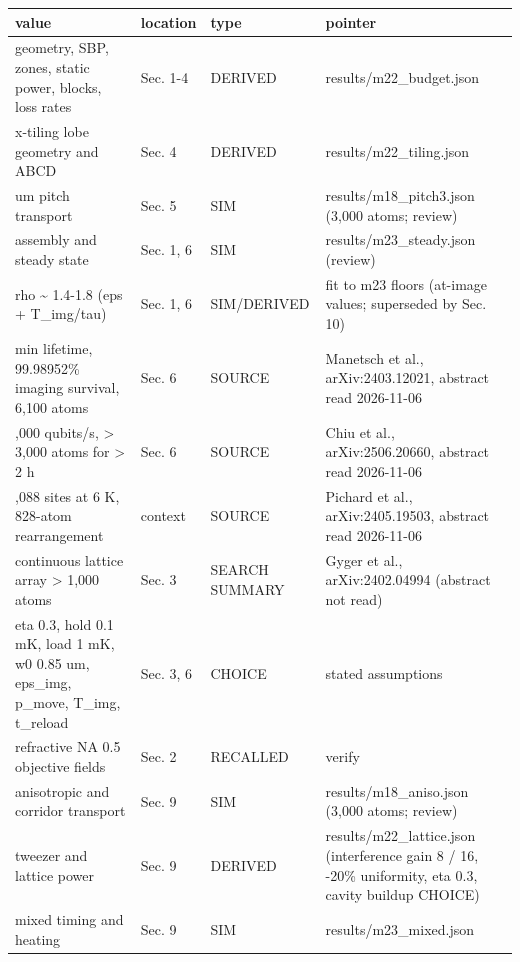 {\footnotesize
\begin{longtable}[]{@{}>{\raggedright\arraybackslash}p{0.306\dimexpr(\linewidth-8\tabcolsep)\relax}>{\raggedright\arraybackslash}p{0.112\dimexpr(\linewidth-8\tabcolsep)\relax}>{\raggedright\arraybackslash}p{0.153\dimexpr(\linewidth-8\tabcolsep)\relax}>{\raggedright\arraybackslash}p{0.429\dimexpr(\linewidth-8\tabcolsep)\relax}@{}}
\toprule\noalign{}
value & location & type & pointer \\
\midrule\noalign{}
\endhead
\bottomrule\noalign{}
\endlastfoot
geometry, SBP, zones, static power, blocks, loss rates & Sec. 1-4 &
DERIVED & results/m22\_budget.json \\
x-tiling lobe geometry and ABCD & Sec. 4 & DERIVED &
results/m22\_tiling.json \\
3 um pitch transport & Sec. 5 & SIM & results/m18\_pitch3.json (3,000
atoms; review) \\
assembly and steady state & Sec. 1, 6 & SIM & results/m23\_steady.json
(review) \\
rho \textasciitilde{} 1.4-1.8 (eps + T\_img/tau) & Sec. 1, 6 &
SIM/DERIVED & fit to m23 floors (at-image values; superseded by Sec.
10) \\
23 min lifetime, 99.98952\% imaging survival, 6,100 atoms & Sec. 6 &
SOURCE & Manetsch et al., arXiv:2403.12021, abstract read 2026-11-06 \\
30,000 qubits/s, \textgreater{} 3,000 atoms for \textgreater{} 2 h &
Sec. 6 & SOURCE & Chiu et al., arXiv:2506.20660, abstract read
2026-11-06 \\
2,088 sites at 6 K, 828-atom rearrangement & context & SOURCE & Pichard
et al., arXiv:2405.19503, abstract read 2026-11-06 \\
continuous lattice array \textgreater{} 1,000 atoms & Sec. 3 & SEARCH
SUMMARY & Gyger et al., arXiv:2402.04994 (abstract not read) \\
eta 0.3, hold 0.1 mK, load 1 mK, w0 0.85 um, eps\_img, p\_move, T\_img,
t\_reload & Sec. 3, 6 & CHOICE & stated assumptions \\
refractive NA 0.5 objective fields & Sec. 2 & RECALLED & verify \\
anisotropic and corridor transport & Sec. 9 & SIM &
results/m18\_aniso.json (3,000 atoms; review) \\
tweezer and lattice power & Sec. 9 & DERIVED & results/m22\_lattice.json
(interference gain 8 / 16, -20\% uniformity, eta 0.3, cavity buildup
CHOICE) \\
mixed timing and heating & Sec. 9 & SIM & results/m23\_mixed.json

\end{longtable}}

